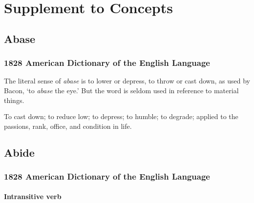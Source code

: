 \section{Supplement to Concepts}
	\label{SUPPLEMENT}
	

	\subsection{Abase} %
		\label{ABASE}
		
		\subsubsection{1828 American Dictionary of the English Language}
			
			\begin{compactitem}
				\item[1] The literal sense of \textit{abase} is to lower or depress, to throw or cast down, as used by Bacon, `to \textit{abase} the eye.' But the word is seldom used in reference to material things.
				\item[2] To cast down; to reduce low; to depress; to humble; to degrade; applied to the passions, rank, office, and condition in life.
			\end{compactitem}

	\subsection{Abide} %
		\label{ABIDE}
		
		\subsubsection{1828 American Dictionary of the English Language}
		
			\paragraph{Intransitive verb}
			
